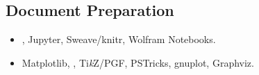 \documentclass[version=last, fontsize=10pt, paper=A4, toc=bibliography]{scrartcl}%
\begin{document}
\subsection*{Document Preparation}\label{subsec:document-preparation}

\begin{itemize}[leftmargin=*]
\item {}, Jupyter, Sweave/knitr, Wolfram Notebooks.%
\item Matplotlib, , Ti\emph{k}Z/PGF, PSTricks, gnuplot,
  Graphviz.
\end{itemize}

\printbibliography[title=Publications]
\end{document}
